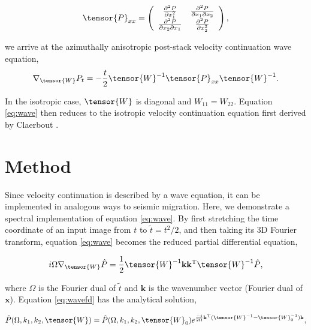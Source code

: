 \begin{equation}
\label{eq:Pxxmatrix}
\tensor{P}_{xx}=\left(
\begin{array}{cc}
 \frac{\partial ^2P }{\partial x_1^2} & \frac{\partial ^2P }{\partial x_1\partial x_2} \\
 \frac{\partial ^2P }{\partial x_2\partial x_1}  & \frac{\partial ^2P }{\partial x_2^2} 
\end{array}
\right),
\end{equation}

\noindent we arrive at the azimuthally anisotropic post-stack velocity continuation wave equation,
\begin{equation}
\label{eq:wave}
\nabla _{\tensor{W}}P_t=-\frac{t}{2}\tensor{W}^{-1}\tensor{P}_{xx}\tensor{W}^{-1}.
\end{equation}

\noindent In the isotropic case, $\tensor{W}$ is diagonal and $W_{11}=W_{22}$.  
Equation \ref{eq:wave} then reduces to the isotropic velocity continuation equation first derived by Claerbout \cite{Claerbout.sep.48.79}.

\section{Method}
Since velocity continuation is described by a wave equation, it can be implemented in analogous ways to seismic migration.  Here, we demonstrate a spectral implementation of equation \ref{eq:wave}.  
By first stretching the time coordinate of an input image from $t$ to $\tilde{t} =t^2/2$, and then taking its 3D Fourier transform, equation \ref{eq:wave} becomes the reduced partial differential equation,

\begin{equation}
\label{eq:wavefd}
i\Omega \nabla _{\tensor{W}}\hat{P} =\frac{1}{2}\tensor{W}^{-1}\mathbf{k}\mathbf{k}^{\mathrm{T}}\tensor{W}^{-1}\hat{P},
\end{equation}

\noindent where $\Omega $ is the Fourier dual of $\tilde{t} $ and $\mathbf{k}$ is the wavenumber vector (Fourier dual of $\mathbf{x}$).  
Equation \ref{eq:wavefd} has the analytical solution,

\begin{equation}
\label{eq:solution}
\hat{P}(\Omega ,k_1,k_2,\tensor{W})=\hat{P}(\Omega ,k_1,k_2,\tensor{W}_0)e^{\frac{-i}{2\Omega }\mathbf{k}^{\mathrm{T}}(\tensor{W}^{-1}-\tensor{W}^{-1}_0)\mathbf{k}},
\end{equation}

